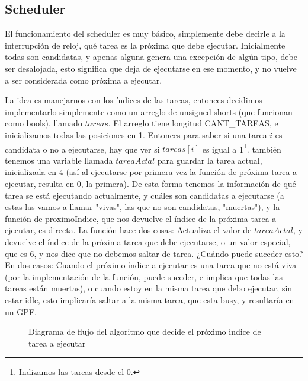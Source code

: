 \documentclass[10pt, a4paper]{article}
\begin{document}
\subsection{Scheduler}
El funcionamiento del scheduler es muy básico, simplemente debe decirle a la interrupción de reloj, qué tarea es la próxima que debe ejecutar. Inicialmente todas son candidatas, y apenas alguna genera una excepción de algún tipo, debe ser desalojada, esto significa que deja de ejecutarse en ese momento, y no vuelve a ser considerada como próxima a ejecutar.

La idea es manejarnos con los índices de las tareas, entonces decidimos implementarlo simplemente como un arreglo de unsigned shorts (que funcionan como bools), llamado $tareas$. El arreglo tiene longitud CANT\_TAREAS, e inicializamos todas las posiciones en 1. Entonces para saber si una tarea $i$ es candidata o no a ejecutarse, hay que ver si $tareas[i]$ es igual a 1\footnote{Indizamos las tareas desde el 0.}. también tenemos una variable llamada $tareaActal$ para guardar la tarea actual, inicializada en 4 (así al ejecutarse por primera vez la función de próxima tarea a ejecutar, resulta en 0, la primera). De esta forma tenemos la información de qué tarea se está ejecutando actualmente, y cuáles son candidatas a ejecutarse (a estas las vamos a llamar "vivas", las que no son candidatas, "muertas"), y la función de proximoIndice, que nos devuelve el índice de la próxima tarea a ejecutar, es directa. La función hace dos cosas: Actualiza el valor de $tareaActal$, y devuelve el índice de la próxima tarea que debe ejecutarse, o un valor especial, que es 6, y nos dice que no debemos saltar de tarea. ¿Cuándo puede suceder esto? En dos casos: Cuando el próximo índice a ejecutar es una tarea que no está viva (por la implementación de la función, puede suceder, e implica que todas las tareas están muertas), o cuando estoy en la misma tarea que debo ejecutar, sin estar idle, esto implicaría saltar a la misma tarea, que esta busy, y resultaría en un GPF.

	\begin{figure}[H]
  		\centering
		\caption{Diagrama de flujo del algoritmo que decide el próximo indice de tarea a ejecutar}
		\label{fig:proximoIndice}
	\end{figure}
	
\end{document}
